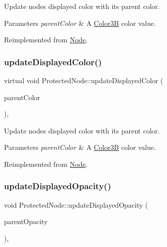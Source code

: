 Update node\textquotesingle{}s displayed color with its parent color. 
\begin{DoxyParams}{Parameters}
{\em parent\+Color} & A \hyperlink{structColor3B}{Color3B} color value. \\
\hline
\end{DoxyParams}


Reimplemented from \hyperlink{classNode_ac733bae7b9590f8da746cbc3d1337a2f}{Node}.

\mbox{\label{classProtectedNode_ab628cf3ac452302f0c653600bb145b49}} 
\subsubsection{\texorpdfstring{update\+Displayed\+Color()}{updateDisplayedColor()}\hspace{0.1cm}{\footnotesize\ttfamily [2/2]}}
{\footnotesize\ttfamily virtual void Protected\+Node\+::update\+Displayed\+Color (\begin{DoxyParamCaption}\item[{const \hyperlink{structColor3B}{Color3B} \&}]{parent\+Color }\end{DoxyParamCaption})\hspace{0.3cm}{\ttfamily [override]}, {\ttfamily [virtual]}}

Update node\textquotesingle{}s displayed color with its parent color. 
\begin{DoxyParams}{Parameters}
{\em parent\+Color} & A \hyperlink{structColor3B}{Color3B} color value. \\
\hline
\end{DoxyParams}


Reimplemented from \hyperlink{classNode_ac733bae7b9590f8da746cbc3d1337a2f}{Node}.

\mbox{\label{classProtectedNode_abe8e7d89709e01b0500ae8cf63991806}} 
\subsubsection{\texorpdfstring{update\+Displayed\+Opacity()}{updateDisplayedOpacity()}\hspace{0.1cm}{\footnotesize\ttfamily [1/2]}}
{\footnotesize\ttfamily void Protected\+Node\+::update\+Displayed\+Opacity (\begin{DoxyParamCaption}\item[{G\+Lubyte}]{parent\+Opacity }\end{DoxyParamCaption})\hspace{0.3cm}{\ttfamily [override]}, {\ttfamily [virtual]}}

